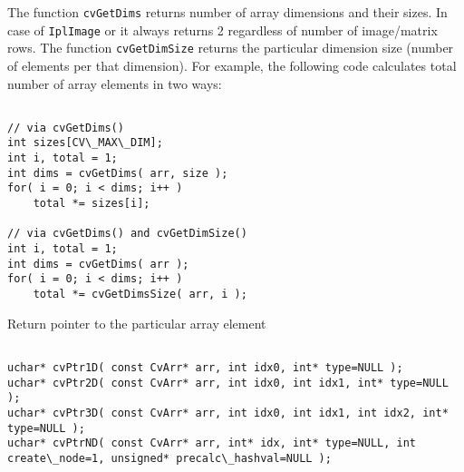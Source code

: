 The function \texttt{cvGetDims} returns number of array dimensions and their sizes. In case of \texttt{IplImage} or  it always returns 2 regardless of number of image/matrix rows. The function \texttt{cvGetDimSize} returns the particular dimension size (number of elements per that dimension). For example, the following code calculates total number of array elements in two ways:

\begin{lstlisting}

// via cvGetDims()
int sizes[CV\_MAX\_DIM];
int i, total = 1;
int dims = cvGetDims( arr, size );
for( i = 0; i < dims; i++ )
    total *= sizes[i];

// via cvGetDims() and cvGetDimSize()
int i, total = 1;
int dims = cvGetDims( arr );
for( i = 0; i < dims; i++ )
    total *= cvGetDimsSize( arr, i );

\end{lstlisting}



Return pointer to the particular array element

\begin{lstlisting}

uchar* cvPtr1D( const CvArr* arr, int idx0, int* type=NULL );
uchar* cvPtr2D( const CvArr* arr, int idx0, int idx1, int* type=NULL );
uchar* cvPtr3D( const CvArr* arr, int idx0, int idx1, int idx2, int* type=NULL );
uchar* cvPtrND( const CvArr* arr, int* idx, int* type=NULL, int create\_node=1, unsigned* precalc\_hashval=NULL );

\end{lstlisting}

\begin{description}
\end{description}

